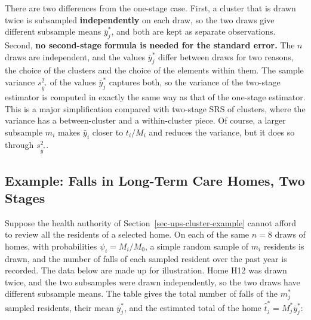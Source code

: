 \documentclass[
  letterpaper,
  DIV=11,
  numbers=noendperiod]{scrreprt}
\renewcommand{\[}{\begin{equation}}
\renewcommand{\]}{\end{equation}}
\begin{document}
There are two differences from the one-stage case. First, a cluster that
is drawn twice is subsampled \textbf{independently} on each draw, so the
two draws give different subsample means \(\bar{y}_j^*\), and both are
kept as separate observations. Second, \textbf{no second-stage formula
is needed for the standard error.} The \(n\) draws are independent, and
the values \(\bar{y}_j^*\) differ between draws for two reasons, the
choice of the clusters and the choice of the elements within them. The
sample variance \(s_{\bar{y}^*}^2\) of the values \(\bar{y}_j^*\)
captures both, so the variance of the two-stage estimator is computed in
exactly the same way as that of the one-stage estimator. This is a major
simplification compared with two-stage SRS of clusters, where the
variance has a between-cluster and a within-cluster piece. Of course, a
larger subsample \(m_i\) makes \(\bar{y}_i\) closer to \(t_i/M_i\) and
reduces the variance, but it does so through \(s_{\bar{y}^*}^2\).

\subsection{Example: Falls in Long-Term Care Homes, Two
Stages}\label{sec-ups-twostage-example}

Suppose the health authority of Section~\ref{sec-ups-cluster-example}
cannot afford to review all the residents of a selected home. On each of
the same \(n=8\) draws of homes, with probabilities \(\psi_i=M_i/M_0\),
a simple random sample of \(m_i\) residents is drawn, and the number of
falls of each sampled resident over the past year is recorded. The data
below are made up for illustration. Home H12 was drawn twice, and the
two subsamples were drawn independently, so the two draws have different
subsample means. The table gives the total number of falls of the
\(m_j^*\) sampled residents, their mean \(\bar{y}_j^*\), and the
estimated total of the home \(\hat{t}_j^*=M_j^*\bar{y}_j^*\):
\end{document}
